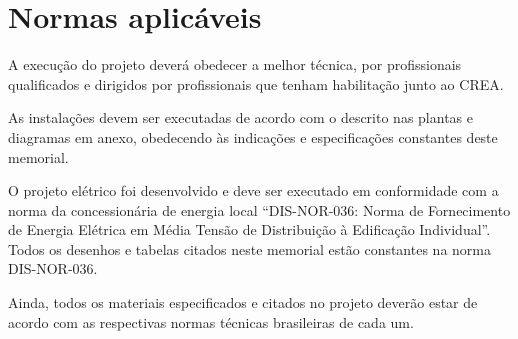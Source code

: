 \section{Normas aplicáveis}

A execução do projeto deverá obedecer a melhor técnica, por profissionais qualificados e dirigidos por profissionais que tenham habilitação junto ao CREA.

As instalações devem ser executadas de acordo com o descrito nas plantas e diagramas em anexo, obedecendo às indicações e especificações constantes deste memorial. 

O projeto elétrico foi desenvolvido e deve ser executado em conformidade com a norma da concessionária de energia local “DIS-NOR-036: Norma de Fornecimento de Energia Elétrica em Média Tensão de Distribuição à Edificação Individual”. Todos os desenhos e tabelas citados neste memorial estão constantes na norma DIS-NOR-036.

Ainda, todos os materiais especificados e citados no projeto deverão estar de acordo com as respectivas normas técnicas brasileiras de cada um. 
